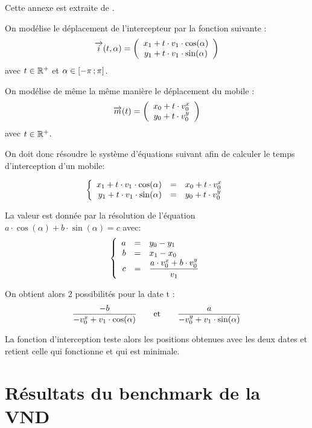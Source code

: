 	Cette annexe est extraite de \cite{projet-zz1}.

	On modélise le déplacement de l'intercepteur par la fonction suivante : 
	\[
	\overrightarrow{i}(t,\alpha) = 
	\left(
	\begin{array}{c}
	 x_1 + t \cdot v_1 \cdot \cos(\alpha)\\
	 y_1 + t \cdot v_1 \cdot \sin(\alpha)
	\end{array}
	\right)
	\]
	avec $t \in \mathbb{R}^+$ et $\alpha \in \mathopen{[}-\pi\mathclose{}\mathpunct{};\pi\mathclose{]}$.

	On modélise de même la même manière le déplacement du mobile :
	\[
	\overrightarrow{m}(t) = 
	\left(
	\begin{array}{c}
	 x_0 + t \cdot v^{x}_0\\
	 y_0 + t \cdot v^{y}_0
	\end{array}
	\right)
	\]
	avec $t \in \mathbb{R}^+$.

	On doit donc résoudre le système d'équations suivant afin de calculer le temps d'interception d'un mobile:

	\[
	\left\{
	\begin{array}{r c l}
	x_1 + t \cdot v_1 \cdot \cos(\alpha) &=& x_0 + t \cdot v^{x}_0\\
	y_1 + t \cdot v_1 \cdot \sin(\alpha) &=& y_0 + t \cdot v^{y}_0
	\end{array}
	\right.
	\]

	La valeur est donnée par la résolution de l'équation $a \cdot \cos(\alpha)+b \cdot \sin(\alpha) = c$ avec:
	\[
	\left\{
	\begin{array}{r c l}
	a &=& y_0 - y_1\\
	b &=& x_1 - x_0\\
	c &=& \displaystyle \frac{a \cdot v^{x}_0 +b \cdot v^{y}_0}{v_1}
	\end{array}
	\right.
	\]

	On obtient alors 2 possibilités pour la date t : 
	\[ \frac{-b}{-v^{x}_0 + v_1 \cdot \cos(\alpha)}  \qquad\text{et}\qquad \frac{a}{-v^{y}_0 + v_1 \cdot \sin(\alpha)} \]

	La fonction d'interception teste alors les positions obtenues avec les deux dates et retient celle qui fonctionne et qui est minimale.
	
\chapter{Résultats du benchmark de la VND}
\label{ann:benchmark-vnd}



